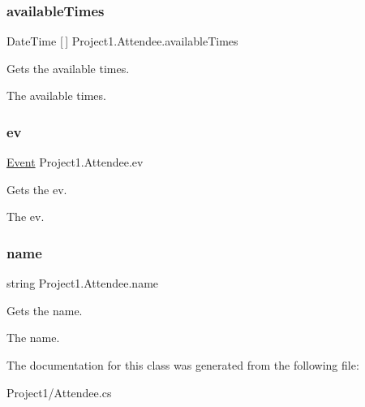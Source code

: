 \subsubsection{\texorpdfstring{available\+Times}{availableTimes}}
{\footnotesize\ttfamily Date\+Time \mbox{[}$\,$\mbox{]} Project1.\+Attendee.\+available\+Times\hspace{0.3cm}{\ttfamily [get]}}



Gets the available times. 

The available times. \mbox{\label{class_project1_1_1_attendee_ad47df6573b4cb7b6dbd6ae35751abdc2}} 
\subsubsection{\texorpdfstring{ev}{ev}}
{\footnotesize\ttfamily \hyperlink{class_project1_1_1_event}{Event} Project1.\+Attendee.\+ev\hspace{0.3cm}{\ttfamily [get]}}



Gets the ev. 

The ev. \mbox{\label{class_project1_1_1_attendee_a5ccf26d80354941e9c4a80157b9fb6c9}} 
\subsubsection{\texorpdfstring{name}{name}}
{\footnotesize\ttfamily string Project1.\+Attendee.\+name\hspace{0.3cm}{\ttfamily [get]}}



Gets the name. 

The name. 

The documentation for this class was generated from the following file\+:\begin{DoxyCompactItemize}
\item 
Project1/Attendee.\+cs\end{DoxyCompactItemize}
